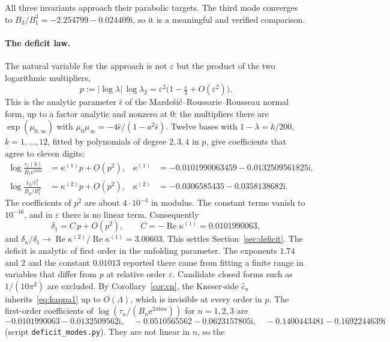 \documentclass[11pt,a4paper]{article}
\theoremstyle{definition}
\newcommand{\eee}{\mathrm{e}}
\newcommand{\ii}{\mathrm{i}}
\begin{document}
All three invariants approach their parabolic targets.  The third mode
converges to $B_3/B_1^3=-2.254799-0.024409\ii$, so it is a meaningful and
verified comparison.

\paragraph{The deficit law.}
The natural variable for the approach is not $\varepsilon$ but the product
of the two logarithmic multipliers,
\[
 p:=|\log\lambda|\,\log\lambda_2=\varepsilon^2\bigl(1-\tfrac{\varepsilon}3+O(\varepsilon^2)\bigr).
\]
This is the analytic parameter $\hat\epsilon$ of the
Marde\v{s}i\'c--Roussarie--Rousseau normal form, up to a factor analytic and
nonzero at $0$: the multipliers there are $\exp(\mu_{0,\infty})$ with
$\mu_0\mu_\infty=-4\hat\epsilon/(1-a^2\hat\epsilon)$.  Twelve bases with
$1-\lambda=k/200$, $k=1,\ldots,12$, fitted by polynomials of degree
$2,3,4$ in $p$, give coefficients that agree to eleven digits:
\begin{equation}\label{eq:kappa1}
\begin{aligned}
 \log\frac{\tau_1(b)}{B_1\eee^{2\pi\ii a}}&=\kappa^{(1)}p+O(p^2),&
 \kappa^{(1)}&=-0.0101990063459-0.0132509561825\ii,\\
 \log\frac{t_2/t_1^2}{B_2/B_1^2}&=\kappa^{(2)}p+O(p^2),&
 \kappa^{(2)}&=-0.0306585435-0.0358138682\ii .
\end{aligned}
\end{equation}
The coefficients of $p^2$ are about $4\cdot10^{-4}$ in modulus.  The constant
terms vanish to $10^{-16}$, and in $\varepsilon$ there is no linear term.
Consequently
\[
 \delta_1=C\,p+O(p^2),\qquad C=-\operatorname{Re}\kappa^{(1)}=0.0101990063,
\]
and $\delta_\kappa/\delta_1\to\operatorname{Re}\kappa^{(2)}/\operatorname{Re}\kappa^{(1)}=3.00603$.
This settles Section~\ref{sec:deficit}.  The deficit is analytic of first order
in the unfolding parameter.  The exponents $1.74$ and $2$ and the constant
$0.01013$ reported there came from fitting a finite range in variables that
differ from $p$ at relative order $\varepsilon$.  Candidate closed forms such as
$1/(10\pi^2)$ are excluded.  By Corollary~\ref{cor:cn}, the Kneser-side
$\hat c_n$ inherits~\eqref{eq:kappa1} up to $O(\Lambda)$, which is invisible at
every order in $p$.  The first-order coefficients of $\log(\tau_n/(B_n\eee^{2\pi\ii na}))$ for
$n=1,2,3$ are
\[
 -0.0101990063-0.0132509562\ii,\quad
 -0.0510565562-0.0623157805\ii,\quad
 -0.1400443481-0.1692244639\ii
\]
(script \texttt{deficit\_modes.py}).  They are not linear in $n$, so the
\end{document}
